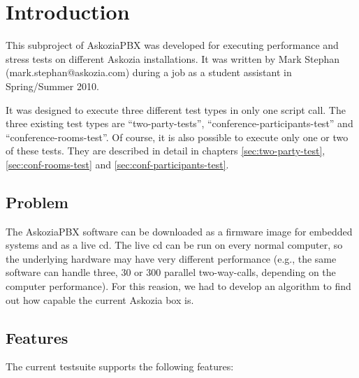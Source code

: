 \section{Introduction}
\label{sec:introduction}

This subproject of AskoziaPBX was developed for executing performance and stress tests on different Askozia installations.
It was written by Mark Stephan \newline (mark.stephan@askozia.com) during a job as a student assistant in Spring/Summer 2010. 

It was designed to execute three different test types in only one script call. The three existing test types are
``two-party-tests'', ``conference-participants-test'' and ``conference-rooms-test''. Of course, it is also possible
to execute only one or two of these tests. They are described in detail in chapters \ref{sec:two-party-test},
\ref{sec:conf-rooms-test} and \ref{sec:conf-participants-test}.

\subsection{Problem}%
The AskoziaPBX software can be downloaded as a firmware image for embedded systems and as a live cd.
The live cd can be run on every normal computer, so the underlying hardware may have very different
performance (e.g., the same software can handle three, 30 or 300 parallel two-way-calls,
depending on the computer performance). For this reasion, we had to develop an algorithm to find out
how capable the current Askozia box is.
 
\subsection{Features}%
The current testsuite supports the following features:

